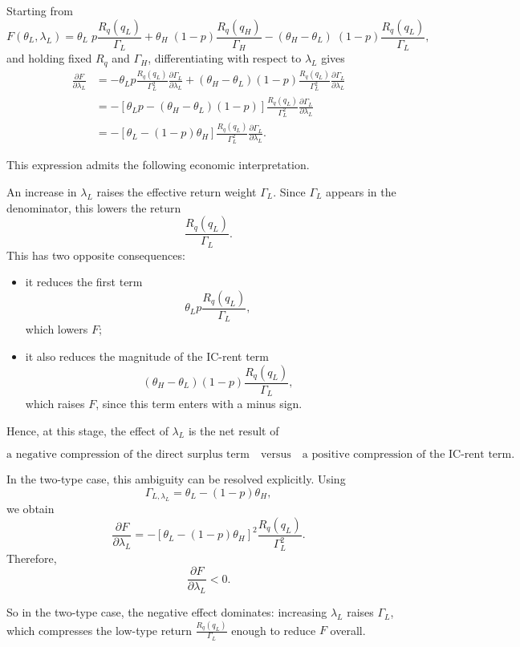 \documentclass[11pt]{article}
\begin{document}
Starting from
\[
F(\theta_L,\lambda_L)
=
\theta_L \;p\frac{R_q(q_L)}{\Gamma_L}
+ \theta_H  \; (1-p)\frac{R_q(q_H)}{\Gamma_H}
- (\theta_H-\theta_L) \; (1 - p)\frac{R_q(q_L)}{\Gamma_L},
\]
and holding fixed \(R_q\) and \(\Gamma_H\), differentiating with respect to \(\lambda_L\) gives
\begin{align*}
\frac{\partial F}{\partial \lambda_L}
&=
-\theta_L p \frac{R_q(q_L)}{\Gamma_L^2}\frac{\partial \Gamma_L}{\partial \lambda_L}
+
(\theta_H-\theta_L)(1-p)\frac{R_q(q_L)}{\Gamma_L^2}\frac{\partial \Gamma_L}{\partial \lambda_L} \\
&=
-\left[\theta_L p-(\theta_H-\theta_L)(1-p)\right]
\frac{R_q(q_L)}{\Gamma_L^2}\frac{\partial \Gamma_L}{\partial \lambda_L} \\
&=
-\left[\theta_L-(1-p)\theta_H\right]
\frac{R_q(q_L)}{\Gamma_L^2}\frac{\partial \Gamma_L}{\partial \lambda_L}.
\end{align*}

This expression admits the following economic interpretation.

An increase in \(\lambda_L\) raises the effective return weight \(\Gamma_L\). Since \(\Gamma_L\) appears in the denominator, this lowers the return
\[
\frac{R_q(q_L)}{\Gamma_L}.
\]
This has two opposite consequences:

\begin{itemize}
    \item it reduces the first term
    \[
    \theta_L p\frac{R_q(q_L)}{\Gamma_L},
    \]
    which lowers \(F\);

    \item it also reduces the magnitude of the IC-rent term
    \[
    (\theta_H-\theta_L)(1-p)\frac{R_q(q_L)}{\Gamma_L},
    \]
    which raises \(F\), since this term enters with a minus sign.
\end{itemize}

Hence, at this stage, the effect of \(\lambda_L\) is the net result of

\[
\text{a negative compression of the direct surplus term}
\quad\text{versus}\quad
\text{a positive compression of the IC-rent term}.
\]

In the two-type case, this ambiguity can be resolved explicitly. Using
\[
\Gamma_{L,\lambda_L}
=
\theta_L-(1-p)\theta_H,
\]
we obtain
\[
\frac{\partial F}{\partial \lambda_L}
=
-\left[\theta_L-(1-p)\theta_H\right]^2
\frac{R_q(q_L)}{\Gamma_L^2}.
\]
Therefore,
\[
\boxed{
\frac{\partial F}{\partial \lambda_L}<0.
}
\]

So in the two-type case, the negative effect dominates: increasing \(\lambda_L\) raises \(\Gamma_L\), which compresses the low-type return \(\frac{R_q(q_L)}{\Gamma_L}\) enough to reduce \(F\) overall.
\end{document}
